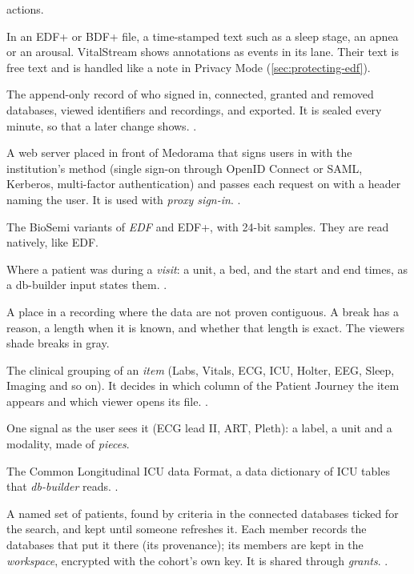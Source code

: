 \begin{description}
  actions.
\item[Annotation] In an EDF+ or BDF+ file, a time-stamped text such as a sleep stage, an apnea or
  an arousal. VitalStream shows annotations as events in its  lane. Their text is
  free text and is handled like a note in Privacy Mode (\cref{sec:protecting-edf}).
\item[Audit log] The append-only record of who signed in, connected, granted and removed
  databases, viewed identifiers and recordings, and exported. It is sealed every minute, so that a later change shows.
  .
\item[Authenticating reverse proxy] A web server placed in front of Medorama that signs users in
  with the institution's method (single sign-on through OpenID Connect or SAML, Kerberos,
  multi-factor authentication) and passes each request on with a header naming the user. It is
  used with \textit{proxy sign-in}. .
\item[BDF, BDF+] The BioSemi variants of \textit{EDF} and EDF+, with 24-bit samples. They are read
  natively, like EDF.
\item[Bed stay] Where a patient was during a \textit{visit}: a unit, a bed, and the start and end
  times, as a db-builder input states them. .
\item[Break] A place in a recording where the data are not proven contiguous. A break has a
  reason, a length when it is known, and whether that length is exact. The viewers shade breaks
  in gray.
\item[Category] The clinical grouping of an \textit{item} (Labs, Vitals, ECG, ICU, Holter, EEG,
  Sleep, Imaging and so on). It decides in which column of the Patient Journey the item appears
  and which viewer opens its file. .
\item[Channel] One signal as the user sees it (ECG lead II, ART, Pleth): a label, a unit and a
  modality, made of \textit{pieces}.
\item[CLIF] The Common Longitudinal ICU data Format, a data dictionary of ICU tables that
  \textit{db-builder} reads. .
\item[Cohort] A named set of patients, found by criteria in the connected databases ticked for
  the search, and kept until someone refreshes it. Each member records the databases that put it
  there (its provenance); its members are kept in the \textit{workspace}, encrypted with the
  cohort's own key. It is shared through \textit{grants}. .

\end{description}
